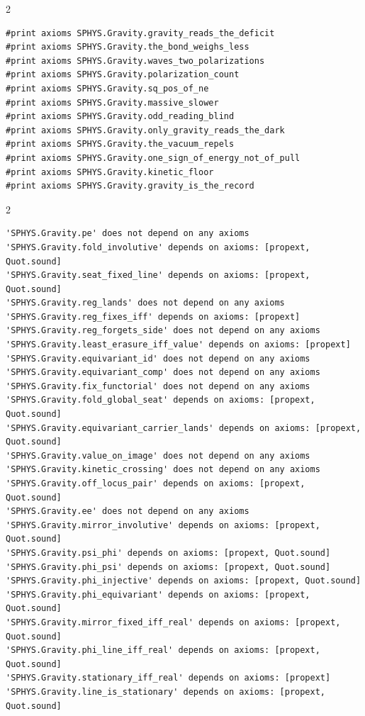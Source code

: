 \documentclass[10pt]{article}
\begin{document}
\begin{multicols}{2}
\begin{Verbatim}[fontsize=\fontsize{5.9}{6.8}\selectfont,breaklines,breakanywhere,breaksymbolleft={}]
#print axioms SPHYS.Gravity.gravity_reads_the_deficit
#print axioms SPHYS.Gravity.the_bond_weighs_less
#print axioms SPHYS.Gravity.waves_two_polarizations
#print axioms SPHYS.Gravity.polarization_count
#print axioms SPHYS.Gravity.sq_pos_of_ne
#print axioms SPHYS.Gravity.massive_slower
#print axioms SPHYS.Gravity.odd_reading_blind
#print axioms SPHYS.Gravity.only_gravity_reads_the_dark
#print axioms SPHYS.Gravity.the_vacuum_repels
#print axioms SPHYS.Gravity.one_sign_of_energy_not_of_pull
#print axioms SPHYS.Gravity.kinetic_floor
#print axioms SPHYS.Gravity.gravity_is_the_record
\end{Verbatim}
\end{multicols}

\begin{multicols}{2}
\begin{Verbatim}[fontsize=\fontsize{5.9}{6.8}\selectfont,breaklines,breakanywhere,breaksymbolleft={}]
'SPHYS.Gravity.pe' does not depend on any axioms
'SPHYS.Gravity.fold_involutive' depends on axioms: [propext, Quot.sound]
'SPHYS.Gravity.seat_fixed_line' depends on axioms: [propext, Quot.sound]
'SPHYS.Gravity.reg_lands' does not depend on any axioms
'SPHYS.Gravity.reg_fixes_iff' depends on axioms: [propext]
'SPHYS.Gravity.reg_forgets_side' does not depend on any axioms
'SPHYS.Gravity.least_erasure_iff_value' depends on axioms: [propext]
'SPHYS.Gravity.equivariant_id' does not depend on any axioms
'SPHYS.Gravity.equivariant_comp' does not depend on any axioms
'SPHYS.Gravity.fix_functorial' does not depend on any axioms
'SPHYS.Gravity.fold_global_seat' depends on axioms: [propext, Quot.sound]
'SPHYS.Gravity.equivariant_carrier_lands' depends on axioms: [propext, Quot.sound]
'SPHYS.Gravity.value_on_image' does not depend on any axioms
'SPHYS.Gravity.kinetic_crossing' does not depend on any axioms
'SPHYS.Gravity.off_locus_pair' depends on axioms: [propext, Quot.sound]
'SPHYS.Gravity.ee' does not depend on any axioms
'SPHYS.Gravity.mirror_involutive' depends on axioms: [propext, Quot.sound]
'SPHYS.Gravity.psi_phi' depends on axioms: [propext, Quot.sound]
'SPHYS.Gravity.phi_psi' depends on axioms: [propext, Quot.sound]
'SPHYS.Gravity.phi_injective' depends on axioms: [propext, Quot.sound]
'SPHYS.Gravity.phi_equivariant' depends on axioms: [propext, Quot.sound]
'SPHYS.Gravity.mirror_fixed_iff_real' depends on axioms: [propext, Quot.sound]
'SPHYS.Gravity.phi_line_iff_real' depends on axioms: [propext, Quot.sound]
'SPHYS.Gravity.stationary_iff_real' depends on axioms: [propext]
'SPHYS.Gravity.line_is_stationary' depends on axioms: [propext, Quot.sound]

\end{Verbatim}
\end{multicols}
\end{document}
